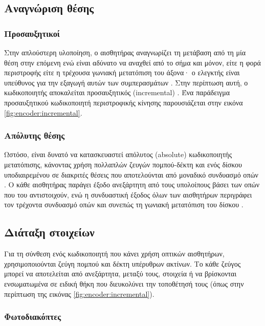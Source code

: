 \subsection{Αναγνώριση θέσης}
\label{subsec:encoder:output}

\subsubsection{Προσαυξητικοί}

Στην απλούστερη υλοποίηση, ο αισθητήρας αναγνωρίζει τη μετάβαση από τη μία θέση
στην επόμενη ενώ είναι αδύνατο να αναχθεί από το σήμα και μόνον, είτε η φορά
περιστροφής είτε η τρέχουσα γωνιακή μετατόπιση του άξονα· ο ελεγκτής είναι
υπεύθυνος για την εξαγωγή αυτών των συμπερασμάτων \parencites[5--6]{lynch02}
[13]{drc76}. Στην περίπτωση αυτή, ο κωδικοποιητής αποκαλείται
προσαυξητικός (incremental)
\parencite[5]{lynch02}. Ένα παράδειγμα προσαυξητικού κωδικοποιητή περιστροφικής
κίνησης παρουσιάζεται στην εικόνα \ref{fig:encoder:incremental}.


\subsubsection{Απόλυτης θέσης}

Ωστόσο, είναι δυνατό να κατασκευαστεί απόλυτος (absolute)
κωδικοποιητής μετατόπισης, κάνοντας
χρήση πολλαπλών ζευγών πομπού-δέκτη και ενός δίσκου υποδιαιρεμένου σε διακριτές
θέσεις που αποτελούνται από μοναδικό συνδυασμό οπών \parencites[6]{lynch02}. Ο
κάθε αισθητήρας παράγει έξοδο ανεξάρτητη από τους υπολοίπους βάσει των οπών που
του αντιστοιχούν, ενώ η συνδυαστική έξοδος όλων των αισθητήρων περιγράφει τον
τρέχοντα συνδυασμό οπών και συνεπώς τη γωνιακή μετατόπιση του δίσκου
\parencites[6]{lynch02}.


\subsection{Διάταξη στοιχείων}
\label{subsec:encoder:layout}

Για τη σύνθεση ενός κωδικοποιητή που κάνει χρήση οπτικών αισθητήρων,
χρησιμοποιούνται ζεύγη πομπού και δέκτη υπέρυθρων ακτίνων. Το κάθε ζεύγος μπορεί
να αποτελείται από ανεξάρτητα, μεταξύ τους, στοιχεία ή να βρίσκονται
ενσωματωμένα σε ειδική θήκη που διευκολύνει την τοποθέτησή τους (όπως στην
περίπτωση της εικόνας \ref{fig:encoder:incremental}).


\subsubsection{Φωτοδιακόπτες}

